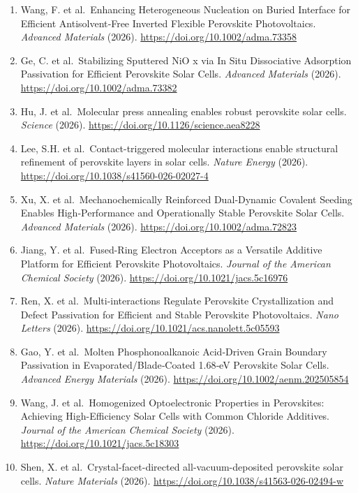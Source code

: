 \documentclass[
  11pt,
]{article}
\begin{document}
\begin{enumerate}
\item
  Wang, F. et al.~Enhancing Heterogeneous Nucleation on Buried Interface
  for Efficient Antisolvent‐Free Inverted Flexible Perovskite
  Photovoltaics. \emph{Advanced Materials} (2026).
  \url{https://doi.org/10.1002/adma.73358}
\item
  Ge, C. et al.~Stabilizing Sputtered NiO x via In Situ Dissociative
  Adsorption Passivation for Efficient Perovskite Solar Cells.
  \emph{Advanced Materials} (2026).
  \url{https://doi.org/10.1002/adma.73382}
\item
  Hu, J. et al.~Molecular press annealing enables robust perovskite
  solar cells. \emph{Science} (2026).
  \url{https://doi.org/10.1126/science.aea8228}
\item
  Lee, S.H. et al.~Contact-triggered molecular interactions enable
  structural refinement of perovskite layers in solar cells.
  \emph{Nature Energy} (2026).
  \url{https://doi.org/10.1038/s41560-026-02027-4}
\item
  Xu, X. et al.~Mechanochemically Reinforced Dual‐Dynamic Covalent
  Seeding Enables High‐Performance and Operationally Stable Perovskite
  Solar Cells. \emph{Advanced Materials} (2026).
  \url{https://doi.org/10.1002/adma.72823}
\item
  Jiang, Y. et al.~Fused-Ring Electron Acceptors as a Versatile Additive
  Platform for Efficient Perovskite Photovoltaics. \emph{Journal of the
  American Chemical Society} (2026).
  \url{https://doi.org/10.1021/jacs.5c16976}
\item
  Ren, X. et al.~Multi-interactions Regulate Perovskite Crystallization
  and Defect Passivation for Efficient and Stable Perovskite
  Photovoltaics. \emph{Nano Letters} (2026).
  \url{https://doi.org/10.1021/acs.nanolett.5c05593}
\item
  Gao, Y. et al.~Molten Phosphonoalkanoic Acid‐Driven Grain Boundary
  Passivation in Evaporated/Blade‐Coated 1.68‐eV Perovskite Solar Cells.
  \emph{Advanced Energy Materials} (2026).
  \url{https://doi.org/10.1002/aenm.202505854}
\item
  Wang, J. et al.~Homogenized Optoelectronic Properties in Perovskites:
  Achieving High-Efficiency Solar Cells with Common Chloride Additives.
  \emph{Journal of the American Chemical Society} (2026).
  \url{https://doi.org/10.1021/jacs.5c18303}
\item
  Shen, X. et al.~Crystal-facet-directed all-vacuum-deposited perovskite
  solar cells. \emph{Nature Materials} (2026).
  \url{https://doi.org/10.1038/s41563-026-02494-w}

\end{enumerate}
\end{document}
